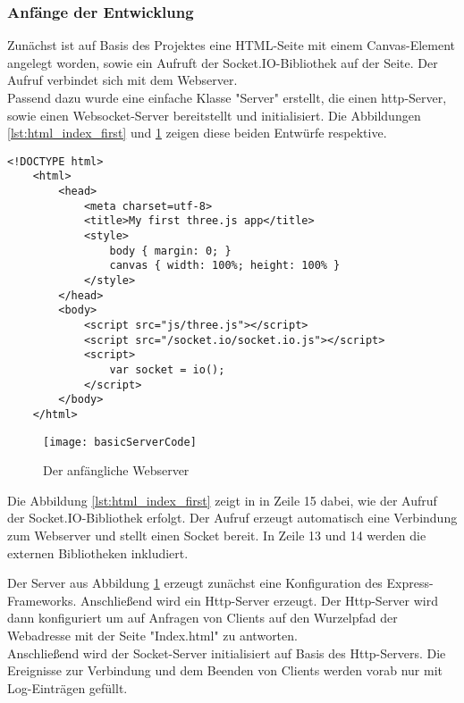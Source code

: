 \subsubsection{Anfänge der Entwicklung}

Zunächst ist auf Basis des Projektes eine HTML-Seite mit einem Canvas-Element angelegt worden, sowie ein Aufruft der Socket.IO-Bibliothek auf der Seite. Der Aufruf verbindet sich mit dem Webserver.\\
Passend dazu wurde eine einfache Klasse "Server" erstellt, die einen http-Server, sowie einen Websocket-Server bereitstellt und initialisiert. Die Abbildungen \ref{lst:html_index_first} und \ref{fig:basicServerCode} zeigen diese beiden Entwürfe respektive.
\clearpage
\lstset{language=HTML5,basicstyle=\footnotesize}
\begin{lstlisting}[caption={[Erste Index.html]\HTML HTML - Erster Prototyp der Einstiegseite}, label=lst:html_index_first]
	<!DOCTYPE html>
	<html>
		<head>
			<meta charset=utf-8>
			<title>My first three.js app</title>
			<style>
				body { margin: 0; }
				canvas { width: 100%; height: 100% }
			</style>
		</head>
		<body>
			<script src="js/three.js"></script>
			<script src="/socket.io/socket.io.js"></script>
			<script>
				var socket = io();
			</script>
		</body>
	</html>
\end{lstlisting}

\begin{figure}[htp]
	\centering
	\captionsetup{justification=centering}
	\texttt{[image: basicServerCode]}
	\caption[erster Server-Code]{Der anfängliche Webserver}
	\label{fig:basicServerCode}
\end{figure}

Die Abbildung \ref{lst:html_index_first} zeigt in in Zeile 15 dabei, wie der Aufruf der Socket.IO-Bibliothek erfolgt. Der Aufruf erzeugt automatisch eine Verbindung zum Webserver und stellt einen Socket bereit.
In Zeile 13 und 14 werden die externen Bibliotheken inkludiert.

Der Server aus Abbildung \ref{fig:basicServerCode} erzeugt zunächst eine Konfiguration des Express-Frameworks. Anschließend wird ein Http-Server erzeugt. Der Http-Server wird dann konfiguriert um auf Anfragen von Clients auf den Wurzelpfad der Webadresse mit der Seite "Index.html" zu antworten.\\
Anschließend wird der Socket-Server initialisiert auf Basis des Http-Servers. Die Ereignisse zur Verbindung und dem Beenden von Clients werden vorab nur mit Log-Einträgen gefüllt.


